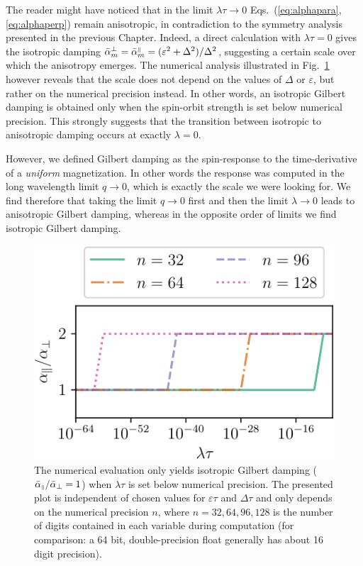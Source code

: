 The reader might have noticed that in the limit $\lambda\tau\rightarrow0$ Eqs.~(\ref{eq:alphapara},\ref{eq:alphaperp}) remain anisotropic, in contradiction to the symmetry analysis presented in the previous Chapter. Indeed, a direct calculation with $\lambda\tau=0$ gives the isotropic damping $\bar{\alpha}_m^{\perp}=\bar{\alpha}_m^{{\scriptscriptstyle\parallel}}=(\varepsilon^2+\Delta^2)/\Delta^2$, suggesting a certain scale over which the anisotropy emerges. The numerical analysis illustrated in Fig.~\ref{fig:num_test} however reveals that the scale does not depend on the values of $\Delta$ or $\varepsilon$, but rather on the numerical precision instead. In other words, an isotropic Gilbert damping is obtained only when the spin-orbit strength is set below numerical precision. This strongly suggests that the transition between isotropic to anisotropic damping occurs at exactly $\lambda=0$. 

However, we defined Gilbert damping as the spin-response to the time-derivative of a \emph{uniform} magnetization. In other words the response was computed in the long wavelength limit $q\rightarrow0$, which is exactly the scale we were looking for. We find therefore that taking the limit $q\rightarrow0$ first and then the limit $\lambda\rightarrow0$ leads to anisotropic Gilbert damping, whereas in the opposite order of limits we find isotropic Gilbert damping.  

\begin{figure}
    \centering
    \includegraphics[width=0.6\linewidth]{gfx/numerical_test}
    \caption{The numerical evaluation only yields isotropic Gilbert damping ($\bar{\alpha}_{{\scriptscriptstyle\parallel}}/\bar{\alpha}_{\perp}=1$) when $\lambda\tau$ is set below numerical precision. The presented plot is independent of chosen values for $\varepsilon\tau$ and $\Delta\tau$ and only depends on the numerical precision $n$, where $n=32,64,96,128$ is the number of digits contained in each variable during computation (for comparison: a 64 bit, double-precision float generally has about 16 digit precision). }
    \label{fig:num_test}
\end{figure}

